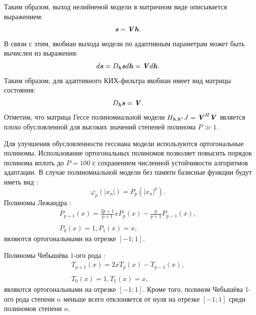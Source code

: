 Таким образом, выход нелийненой модели в матричном виде описывается выражением:
\begin{equation}
	\textbf{\textit{s}}=\textbf{\textit{V}}\textbf{\textit{h}}.
	\label{polynom_output}
\end{equation}
В связи с этим, якобиан выхода модели по адаптивным параметрам может быть вычислен из выражения:
\begin{equation}
	d\textbf{\textit{s}}=D_{\textbf{\textit{h}}}\textbf{\textit{s}}d\textbf{\textit{h}}=\textbf{\textit{V}}d\textbf{\textit{h}}.
	\label{different_polynom}
\end{equation}
Таким образом, для адаптивного КИХ-фильтра якобиан имеет вид матрицы состояния:
\begin{equation}
	D_{\textbf{\textit{h}}}\textbf{\textit{s}}=\textbf{\textit{V}}.
	\label{jacobian_polynom}
\end{equation}
Отметим, что матрица Гессе полиномиальной модели $H_{\textbf{\textit{h}},\textbf{\textit{h}}^*}J=\textbf{\textit{V}}^H\textbf{\textit{V}}$ является плохо обусловленной для высоких значений степеней полинома $P\gg1$.

Для улучшения обусловленности гессиана модели используются ортогональные полиномы. Использование ортогональных полиномов позволяет повысить порядок полинома вплоть до $P=100$ с сохранением численной устойчивости алгоритмов адаптации. В случае полиномиальной модели без памяти базисные функции будут иметь вид \cite{dpd_models}:
\begin{equation}
	\varphi_p(|x_n|)= P_p(|x_n|^p).
\end{equation}
Полиномы Лежандра \cite{spec_func}:
\begin{equation}
	\begin{matrix}
		\displaystyle P_{p+1}(x)=\frac{2p+1}{p+1}xP_p(x)-\frac{p}{p+1}P_{p-1}(x),\\ \\
		P_0(x)=1, P_1(x)=x,
	\end{matrix}
	\label{polynom_legandr}
\end{equation}
являются ортогональными на отрезке $[-1; 1]$.

Полиномы Чебышёва $1$-ого рода \cite{spec_func}:
\begin{equation}
	\begin{matrix}
		T_{p+1}(x)=2xT_p(x)-T_{p-1}(x),\\ \\
		T_0(x)=1, T_1(x)=x,
	\end{matrix}
	\label{polynom_chebi_1}
\end{equation}
являются ортогональными на отрезке $[-1; 1]$. Кроме того, полином Чебышёва 1-ого рода степени $n$ меньше всего отклоняется от нуля на отрезке $[-1; 1]$ среди полиномов степени $n$.

